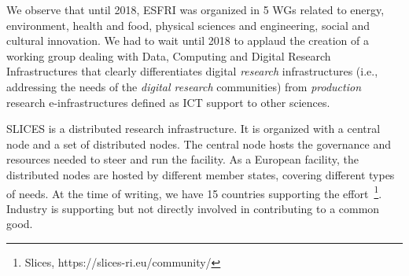 We observe that until 2018, ESFRI was organized in 5 WGs related to energy, environment, health and food, physical sciences and engineering, social and cultural innovation. We had to wait until 2018 to applaud the creation of a working group dealing with Data, Computing and Digital Research Infrastructures that clearly differentiates digital \emph{research} infrastructures (i.e., addressing the needs of the \emph{digital research} communities) from \emph{production} research e-infrastructures defined as ICT support to other sciences.

SLICES is a distributed research infrastructure. It is organized with a central node and a set of distributed nodes. The central node hosts the governance and resources needed to steer and run the facility. As a European facility, the distributed nodes are hosted by different member states, covering different types of needs. At the time of writing, we have 15 countries supporting the effort~\footnote{Slices, https://slices-ri.eu/community/}. Industry is supporting but not directly involved in contributing to a common good.

